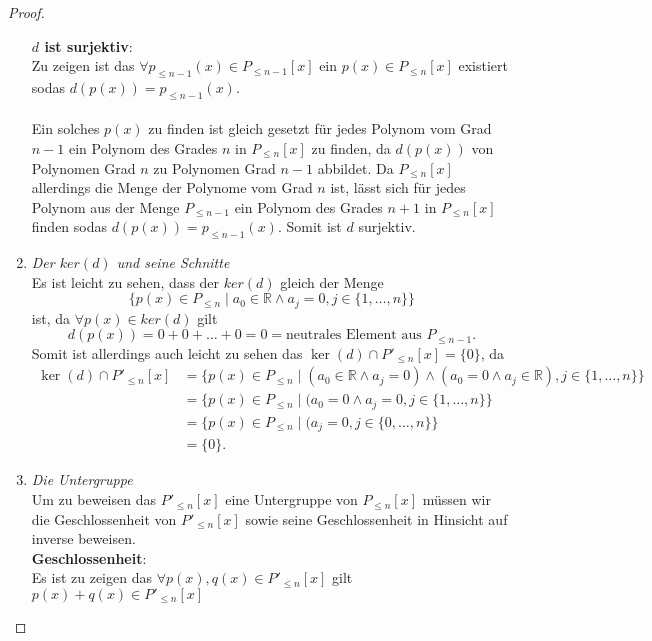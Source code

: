 \documentclass{../problemset}
\begin{document}
\begin{problem}
\begin{proof}
\begin{enumerate}
		      \textbf{$d$ ist surjektiv}: \\
		      Zu zeigen ist das $\forall p_{\le n-1}(x) \in P_{\le n-1}[x]$ ein $p(x) \in P_{\le n}[x]$ existiert sodas $d(p(x)) = p_{\le n-1}(x)$.
		      \\\\
		      Ein solches $p(x)$ zu finden ist gleich gesetzt für jedes Polynom vom Grad $n-1$ ein Polynom des Grades $n$ in $P_{\le n}[x]$ zu finden,
		      da $d(p(x))$ von Polynomen Grad $n$ zu Polynomen Grad $n-1$ abbildet.
		      Da $P_{\le n}[x]$ allerdings die Menge der Polynome vom Grad $n$ ist,
		      lässt sich für jedes Polynom aus der Menge $P_{\le n - 1}$ ein Polynom des Grades $n+1$ in $P_{\le n}[x]$ finden sodas $d(p(x)) = p_{\le n -1}(x)$.
		      Somit ist $d$ surjektiv.
		      \checkmark
		\item \textit{Der $ker(d)$ und seine Schnitte} \\
		      Es ist leicht zu sehen, dass der $ker(d)$ gleich der Menge \[
			      \{p(x) \in P_{\le n} \mid a_0 \in \mathbb{R} \land a_j = 0, j \in \{1, \ldots, n\}\}
		      \] ist, da $\forall p(x) \in ker(d)$ gilt \[
			      d(p(x)) = 0 + 0 + \ldots + 0 = 0 = \text{neutrales Element aus } P_{\le n-1}.
		      \]
		      Somit ist allerdings auch leicht zu sehen das $\ker(d) \cap P'_{\le n}[x] = \{0\}$, da \begin{align}
			      \ker(d) \cap P'_{\le n}[x] & = \{p(x) \in P_{\le n} \mid (a_0 \in \mathbb{R} \land a_j = 0) \land (a_0 = 0 \land a_j \in \mathbb{R}), j \in \{1, \ldots, n\}\} \\
			                                 & = \{p(x) \in P_{\le n} \mid (a_0 = 0 \land a_j = 0, j \in \{1, \ldots, n\}\}                                                      \\
			                                 & = \{p(x) \in P_{\le n} \mid (a_j = 0, j \in \{0, \ldots, n\}\}                                                                    \\
			                                 & = \{0\}.
		      \end{align}
		      \checkmark
		\item \textit{Die Untergruppe} \\
		      Um zu beweisen das $P'_{\le n}[x]$ eine Untergruppe von $P_{\le n}[x]$ müssen wir die Geschlossenheit von $P'_{\le n}[x]$ sowie seine Geschlossenheit in Hinsicht auf inverse beweisen. \\
		      \textbf{Geschlossenheit}: \\
		      Es ist zu zeigen das $\forall p(x),q(x) \in P'_{\le n}[x]$ gilt $p(x) + q(x) \in P'_{\le n}[x]$


\end{enumerate}
\end{proof}
\end{problem}
\end{document}
